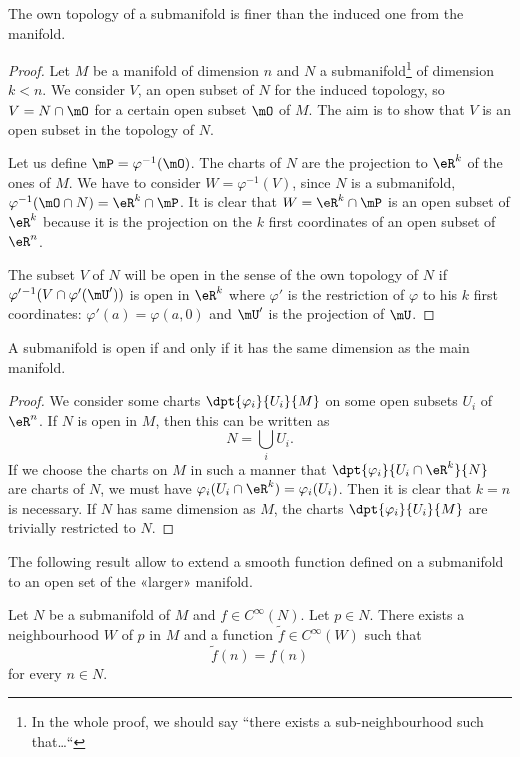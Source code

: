 \begin{proposition}\label{prop:topo_sub_manif}
	The own topology of a submanifold is finer than the induced one from the manifold.
\end{proposition}

\begin{proof}
	Let $M$ be a manifold of dimension $n$ and $N$ a submanifold\footnote{In the whole proof, we should say ``there exists a sub-neighbourhood such that\ldots``} of dimension $k<n$. We consider $V$, an open subset of $N$ for the induced topology, so $V=N\cap\mO$ for a certain open subset $\mO$ of $M$. The aim is to show that $V$ is an open subset in the topology of $N$.

	Let us define $\mP=\varphi^{-1}(\mO)$.  The charts of $N$ are the projection to $\eR^k$ of the ones of $M$. We have to consider $W=\varphi^{-1}(V)$, since $N$ is a submanifold, $\varphi^{-1}(\mO\cap N)=\eR^k\cap\mP$. It is clear that $W=\eR^k\cap\mP$ is an open subset of $\eR^k$ because it is the projection on the $k$ first coordinates of an open subset of $\eR^n$.

	The subset $V$ of $N$ will be open in the sense of the own topology of $N$ if $\varphi'{}^{-1}(V\cap\varphi'(\mU'))$ is open in $\eR^k$ where $\varphi'$ is the restriction of $\varphi$ to his $k$ first coordinates: $\varphi'(a)=\varphi(a,0)$ and $\mU'$ is the projection of $\mU$.
\end{proof}


\begin{proposition}\label{prop:subvar_ouvert}
	A submanifold is open if and only if it has the same dimension as the main manifold.
\end{proposition}

\begin{proof}
	We consider some charts $\dpt{\varphi_i}{U_i}{M}$ on some open subsets $U_i$ of $\eR^n$. If $N$ is open in $M$, then this can be written as
	\[
		N=\bigcup_iU_i.
	\]
	If we choose the charts on $M$ in such a manner that $\dpt{\varphi_i}{U_i\cap \eR^k}{N}$ are charts of $N$, we must have $\varphi_i(U_i\cap\eR^k)=\varphi_i(U_i)$. Then it is clear that $k=n$ is necessary.
	If $N$ has same dimension as $M$, the charts $\dpt{\varphi_i}{U_i}{M}$ are trivially restricted to $N$.
\end{proof}

The following result allow to extend a smooth function defined on a submanifold to an open set of the «larger» manifold.
\begin{proposition}     \label{PROPooOTZQooIfboXV}
	Let \( N\) be a submanifold of \( M\) and \( f\in  C^{\infty}(N)\). Let \( p\in N\). There exists a neighbourhood \( W\) of \( p\) in \( M\) and a function \( \tilde f\in  C^{\infty}(W)\) such that
	\begin{equation}
		\tilde f(n)=f(n)
	\end{equation}
	for every \( n\in N\).
\end{proposition}

